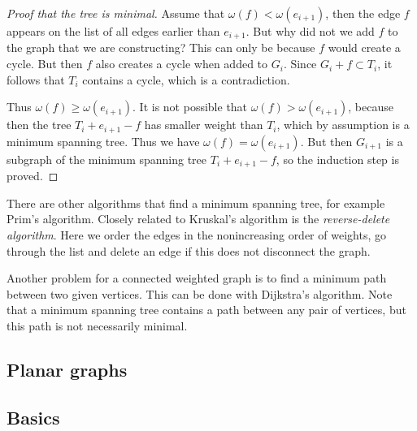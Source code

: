 \begin{page}
\begin{proof}[Proof that the tree is minimal]
Assume that $\omega(f) < \omega(e_{i+1})$, then the edge $f$ appears on the list of all edges earlier than $e_{i+1}$.
But why did not we add $f$ to the graph that we are constructing?
This can only be because $f$ would create a cycle.
But then $f$ also creates a cycle when added to $G_i$.
Since $G_i + f \subset T_i$, it follows that $T_i$ contains a cycle, which is a contradiction.

Thus $\omega(f) \ge \omega(e_{i+1})$.
It is not possible that $\omega(f) > \omega(e_{i+1})$, because then the tree $T_i + e_{i+1} - f$ has smaller weight than $T_i$,
which by assumption is a minimum spanning tree.
Thus we have $\omega(f) = \omega(e_{i+1})$.
But then $G_{i+1}$ is a subgraph of the minimum spanning tree $T_i + e_{i+1} - f$, so the induction step is proved.
\end{proof}



\end{page}

\begin{page}

\begin{rem}
There are other algorithms that find a minimum spanning tree, for example Prim's algorithm.
Closely related to Kruskal's algorithm is the \emph{reverse-delete algorithm}.
Here we order the edges in the nonincreasing order of weights, go through the list
and delete an edge if this does not disconnect the graph.
\end{rem}

\end{page}

\begin{page}

\begin{rem}
Another problem for a connected weighted graph is to find a minimum path between two given vertices.
This can be done with Dijkstra's algorithm.
Note that a minimum spanning tree contains a path between any pair of vertices, but this path is not necessarily minimal.
\end{rem}

\end{page}

\begin{page}

\section{Planar graphs}
\subsection{Basics}

\end{page}


